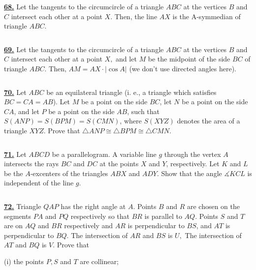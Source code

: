 \documentclass{article}
\begin{document}
$$ $$

\href{ http://www.artofproblemsolving.com/Forum/viewtopic.php?p=564645#p564645
}{\bf 68.} Let the tangents to the circumcircle of a triangle $ABC$ at the vertices $B$ and $C$ intersect each other at a point $X.$ Then, the line $AX$ is the A-symmedian of triangle $ABC.$


$$ $$

\href{ http://www.artofproblemsolving.com/Forum/viewtopic.php?p=564645#p564645
}{\bf 69.} Let the tangents to the circumcircle of a triangle $ABC$ at the vertices $B$ and $C$ intersect each other at a point $X,$ and let $M$ be the midpoint of the side $BC$ of triangle $ABC.$ Then, $AM=AX\cdot\left|\cos A\right|$ (we don't use directed angles here).


$$ $$

\href{http://www.artofproblemsolving.com/Forum/viewtopic.php?p=529958#p529958
 }{\bf 70.} Let $ABC$ be an equilateral triangle (i. e., a triangle which satisfies $BC=CA=AB$). Let $M$ be a point on the side $BC$, let $N$ be a point on the side $CA$, and let $P$ be a point on the side $AB$, such that $S\left(ANP\right)=S\left(BPM\right)=S\left(CMN\right)$, where $S\left(XYZ\right)$ denotes the area of a triangle $XYZ$.
Prove that $\triangle ANP\cong\triangle BPM\cong\triangle CMN$.


$$ $$

\href{ http://www.artofproblemsolving.com/Forum/viewtopic.php?p=512720#p512720
}{\bf 71.}  Let $ABCD$ be a parallelogram. A variable line $g$ through the vertex $A$ intersects the rays $BC$ and $DC$ at the points $X$ and $Y$, respectively. Let $K$ and $L$ be the $A$-excenters of the triangles $ABX$ and $ADY$. Show that the angle $\measuredangle KCL$ is independent of the line $g$.










$$ $$

\href{http://www.artofproblemsolving.com/Forum/viewtopic.php?p=477064#p477064
 }{\bf 72.} Triangle $QAP$ has the right angle at $A.$ Points $B$ and $R$ are chosen on the segments $PA$ and $PQ$ respectively so that $BR$ is parallel to $AQ.$ Points $S$ and $T$ are on $AQ$ and $BR$ respectively and $AR$ is perpendicular to $BS$, and $AT$ is perpendicular to $BQ.$ The intersection of $AR$ and $BS$ is $U,$ The intersection of $AT$ and $BQ$ is $V.$ Prove that

(i) the points $P, S$ and $T$ are collinear;
\end{document}
